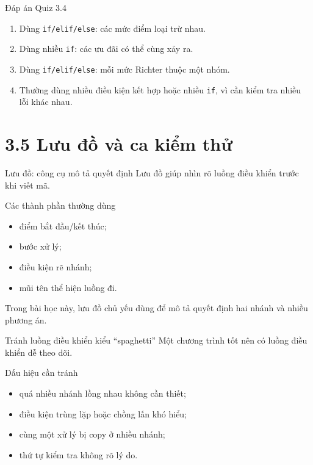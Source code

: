 \documentclass[aspectratio=169,11pt]{beamer}
\newcommand{\code}[1]{\texttt{#1}}
\newcommand{\smallgap}{\vspace{0.4em}}
\begin{document}
\begin{frame}{Đáp án Quiz 3.4}
\begin{enumerate}
  \item Dùng \code{if/elif/else}: các mức điểm loại trừ nhau.
  \item Dùng nhiều \code{if}: các ưu đãi có thể cùng xảy ra.
  \item Dùng \code{if/elif/else}: mỗi mức Richter thuộc một nhóm.
  \item Thường dùng nhiều điều kiện kết hợp hoặc nhiều \code{if}, vì cần kiểm tra nhiều lỗi khác nhau.
\end{enumerate}
\end{frame}

\section{3.5 Lưu đồ và ca kiểm thử}

\begin{frame}{Lưu đồ: công cụ mô tả quyết định}
Lưu đồ giúp nhìn rõ luồng điều khiển trước khi viết mã.\smallgap

\begin{block}{Các thành phần thường dùng}
\begin{itemize}
  \item điểm bắt đầu/kết thúc;
  \item bước xử lý;
  \item điều kiện rẽ nhánh;
  \item mũi tên thể hiện luồng đi.
\end{itemize}
\end{block}
\smallgap
Trong bài học này, lưu đồ chủ yếu dùng để mô tả quyết định hai nhánh và nhiều phương án.
\end{frame}

\begin{frame}{Tránh luồng điều khiển kiểu ``spaghetti''}
Một chương trình tốt nên có luồng điều khiển dễ theo dõi.
\begin{alertblock}{Dấu hiệu cần tránh}
\begin{itemize}
  \item quá nhiều nhánh lồng nhau không cần thiết;
  \item điều kiện trùng lặp hoặc chồng lấn khó hiểu;
  \item cùng một xử lý bị copy ở nhiều nhánh;
  \item thứ tự kiểm tra không rõ lý do.
\end{itemize}
\end{alertblock}
\end{frame}
\end{document}
